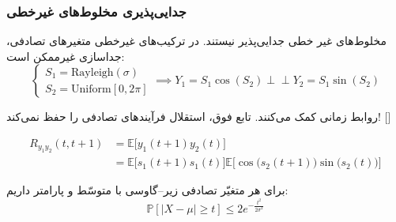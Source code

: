 \documentclass{beamer}
\begin{document}
\begin{frame}
\frametitle{جدایی‌پذیری مخلوط‌های غیرخطی}
{
	\begin{block}{مخلوط‌های غیر خطی جدایی‌پذیر نیستند.}
		در ترکیب‌های غیرخطی متغیر‌های تصادفی، جداسازی غیرممکن است:
		\begin{equation*}
		\begin{cases}
		
		S_1 = \mathrm{Rayleigh}(\sigma)\\
		S_2 = \mathrm{Uniform} [0, 2\pi]
		\end{cases}
		\implies
		Y_1 = S_1 \cos (S_2) \perp \!\!\! \perp Y_2 =  S_1 \sin (S_2)
		\end{equation*}
	\end{block}
}
{
	
	\pause
	\begin{block}{روابط زمانی کمک می‌کنند.}
		تابع فوق، استقلال فرآیند‌های تصادفی را حفظ نمی‌کند!
		\footnotesize{[]}
		
		\begin{align*}
		R_{y_1y_2}(t, t+1) &= \mathbb{E}\big[{y_1(t+1)y_2(t)}\big]\\
		&= \mathbb{E}\Big[s_1(t+1)s_1(t)\Big]
		\mathbb{E}\Big[\cos\big(s_2(t+1)\big)\sin\big(s_2(t)\big)\Big]
		\end{align*}
		
	\end{block}
}

\begin{block}	\label{thm1subgaussian}
	برای هر متغیّر تصادفی زیر--گاوسی 
	با متوسّط
	و پارامتر
	\lr{$\sigma$}
	داریم:
	\begin{equation}
	\mathbb{P}[|X-\mu|\geq t] \leq 2e^{-\frac{t^2}{2\sigma^2}}
	\end{equation}
\end{block}
\end{frame}
\end{document}
